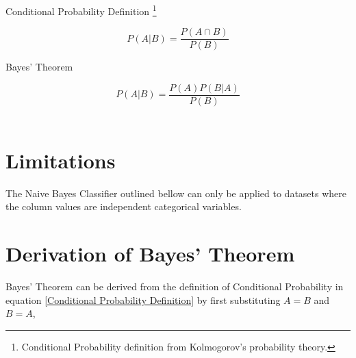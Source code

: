 \documentclass{article}
\begin{document}
%
%


\begin{center} Conditional Probability Definition \footnote{Conditional Probability definition from Kolmogorov's probability theory. } \end{center}

\begin{equation} \tag{1}
		\nonumber P \left( A | B \right) = \frac{ P  \left( A \cap B \right)}{P \left( B \right)}
		\label{Conditional Probability Definition}
\end{equation} 

%
%


\begin{center} Bayes' Theorem \end{center}

\begin{equation} \tag{2}
		\nonumber P \left( A | B \right) = \frac{ P  \left( A  \right) P \left( B | A \right)}{P \left( B \right)}
		\label{Bayes' Theorem}
\end{equation} \\

%
%

\section{Limitations}
The Naive Bayes Classifier outlined bellow can only be applied to datasets where the column values are independent categorical variables.


%
%

\section{Derivation of Bayes' Theorem }
Bayes' Theorem can be derived from the definition of Conditional Probability in  equation \ref{Conditional Probability Definition} by first substituting $A = B$ and $B = A$,

\end{document}
